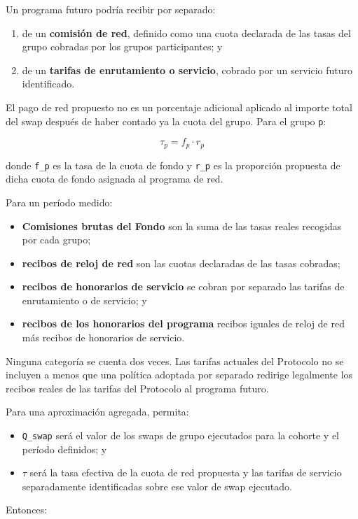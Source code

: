 \documentclass[11pt]{article}
\begin{document}
Un programa futuro podría recibir por separado:

\begin{enumerate}[leftmargin=*]
\item de un \textbf{comisión de red}, definido como una cuota declarada de las tasas del grupo cobradas por los grupos participantes; y
\item de un \textbf{tarifas de enrutamiento o servicio}, cobrado por un servicio futuro identificado.
\end{enumerate}
El pago de red propuesto no es un porcentaje adicional aplicado al importe total del swap después de haber contado ya la cuota del grupo. Para el grupo \texttt{p}:

\[
\tau_p = f_p \cdot r_p
\]

donde \texttt{f\_p} es la tasa de la cuota de fondo y \texttt{r\_p} es la proporción propuesta de dicha cuota de fondo asignada al programa de red.

Para un período medido:

\begin{itemize}[leftmargin=*]
\item \textbf{Comisiones brutas del Fondo} son la suma de las tasas reales recogidas por cada grupo;
\item \textbf{recibos de reloj de red} son las cuotas declaradas de las tasas cobradas;
\item \textbf{recibos de honorarios de servicio} se cobran por separado las tarifas de enrutamiento o de servicio; y
\item \textbf{recibos de los honorarios del programa} recibos iguales de reloj de red más recibos de honorarios de servicio.
\end{itemize}
Ninguna categoría se cuenta dos veces. Las tarifas actuales del Protocolo no se incluyen a menos que una política adoptada por separado redirige legalmente los recibos reales de las tarifas del Protocolo al programa futuro.

Para una aproximación agregada, permita:

\begin{itemize}[leftmargin=*]
\item \texttt{Q\_swap} será el valor de los swaps de grupo ejecutados para la cohorte y el período definidos; y
\item \texttt{$\tau$} será la tasa efectiva de la cuota de red propuesta y las tarifas de servicio separadamente identificadas sobre ese valor de swap ejecutado.
\end{itemize}
Entonces:
\end{document}
